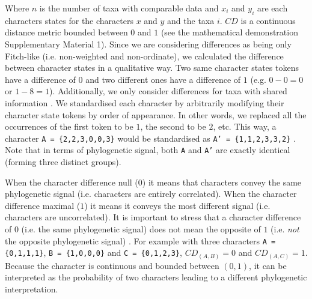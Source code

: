 \documentclass[12pt,letterpaper]{article}
\begin{document}
\noindent Where $n$ is the number of taxa with comparable data and $x_i$ and $y_i$ are each characters states for the characters $x$ and $y$ and the taxa $i$.
$CD$ is a continuous distance metric bounded between $0$ and $1$ (see the mathematical demonstration Supplementary Material 1).
Since we are considering differences as being only Fitch-like (i.e. non-weighted and non-ordinate), we calculated the difference between character states in a qualitative way.
Two same character states tokens have a difference of $0$ and two different ones have a difference of $1$ (e.g. $0 - 0 = 0$ or $1 - 8 = 1$).
Additionally, we only consider differences for taxa with shared information \citep[i.e. a Gower distance;][]{GowerDist}.
We standardised each character by arbitrarily modifying their character state tokens by order of appearance.
In other words, we replaced all the occurrences of the first token to be $1$, the second to be $2$, etc.
This way, a character \texttt{A = \{2,2,3,0,0,3\}} would be standardised as \texttt{A' = \{1,1,2,3,3,2\}} \citep[following the \textit{xyz} notation in][p.13]{felsenstein2004inferring}.
Note that in terms of phylogenetic signal, both \texttt{A} and \texttt{A'} are exactly identical (forming three distinct groups).

When the character difference null ($0$) it means that characters convey the same phylogenetic signal (i.e. characters are entirely correlated).
When the character difference maximal ($1$) it means it conveys the most different signal (i.e. characters are uncorrelated).
It is important to stress that a character difference of $0$ (i.e. the same phylogenetic signal) does not mean the opposite of $1$ (i.e. \textit{not} the opposite phylogenetic signal) .
For example with three characters \texttt{A = \{0,1,1,1\}}, \texttt{B = \{1,0,0,0\}} and \texttt{C = \{0,1,2,3\}}, $CD_{(A,B)} = 0$ and $CD_{(A,C)} = 1$.
Because the character is continuous and bounded between $(0,1)$, it can be interpreted as the probability of two characters leading to a different phylogenetic interpretation.
\end{document}
